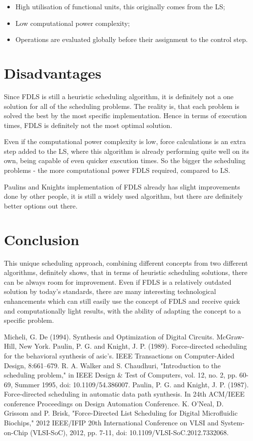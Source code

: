 \documentclass[conference]{IEEEtran}
\begin{document}
\begin{itemize}
\item High utilisation of functional units, this originally comes from the LS;
\item Low computational power complexity;
\item Operations are evaluated globally before their assignment to the control step.
\end{itemize}

\section{Disadvantages}
Since FDLS is still a heuristic scheduling algorithm, it is definitely not a one solution for all of the scheduling problems. The reality is, that each problem is solved the best by the most specific implementation. Hence in terms of execution times, FDLS is definitely not the most optimal solution.

Even if the computational power complexity is low, force calculations is an extra step added to the LS, where this algorithm is already performing quite well on its own, being capable of even quicker execution times. So the bigger the scheduling problems - the more computational power FDLS required, compared to LS.

Paulins and Knights implementation of FDLS already has slight improvements done by other people, it is still a widely used algorithm, but there are definitely better options out there.

\section{Conclusion}
This unique scheduling approach, combining different concepts from two different algorithms, definitely shows, that in terms of heuristic scheduling solutions, there can be always room for improvement. Even if FDLS is a relatively outdated solution by today's standards, there are many interesting technological enhancements which can still easily use the concept of FDLS and receive quick and computationally light results, with the ability of adapting the concept to a specific problem.

\begin{thebibliography}{00}
Micheli, G. De (1994). Synthesis and Optimization of Digital Circuits. McGraw-Hill, New York.
Paulin, P. G. and Knight, J. P. (1989). Force-directed scheduling for the behavioral synthesis of asic’s. IEEE Transactions on Computer-Aided Design, 8:661–679.
R. A. Walker and S. Chaudhuri, "Introduction to the scheduling problem," in IEEE Design & Test of Computers, vol. 12, no. 2, pp. 60-69, Summer 1995, doi: 10.1109/54.386007.
Paulin, P. G. and Knight, J. P. (1987). Force-directed scheduling in automatic data path synthesis. In 24th ACM/IEEE conference Proceedings on Design Automation Conference.
K. O'Neal, D. Grissom and P. Brisk, "Force-Directed List Scheduling for Digital Microfluidic Biochips," 2012 IEEE/IFIP 20th International Conference on VLSI and System-on-Chip (VLSI-SoC), 2012, pp. 7-11, doi: 10.1109/VLSI-SoC.2012.7332068.
\end{thebibliography}
\end{document}
